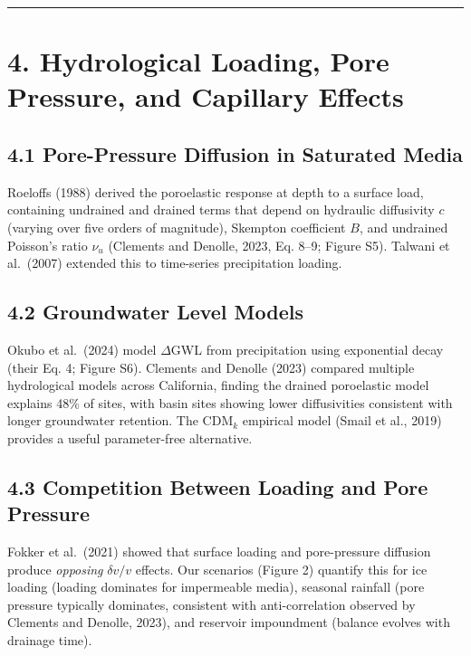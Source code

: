 \documentclass[12pt]{article}
\begin{document}
\begin{center}\rule{0.5\linewidth}{0.5pt}\end{center}

\section{4. Hydrological Loading, Pore Pressure, and Capillary
Effects}\label{hydrological-loading-pore-pressure-and-capillary-effects}

\subsection{4.1 Pore-Pressure Diffusion in Saturated
Media}\label{pore-pressure-diffusion-in-saturated-media}

Roeloffs (1988) derived the poroelastic response at depth to a surface
load, containing undrained and drained terms that depend on hydraulic
diffusivity \(c\) (varying over five orders of magnitude), Skempton
coefficient \(B\), and undrained Poisson's ratio \(\nu_u\) (Clements and
Denolle, 2023, Eq. 8--9; Figure S5). Talwani et al.~(2007) extended this
to time-series precipitation loading.

\subsection{4.2 Groundwater Level
Models}\label{groundwater-level-models}

Okubo et al.~(2024) model \(\Delta\)GWL from precipitation using
exponential decay (their Eq. 4; Figure S6). Clements and Denolle (2023)
compared multiple hydrological models across California, finding the
drained poroelastic model explains 48\% of sites, with basin sites
showing lower diffusivities consistent with longer groundwater
retention. The CDM\(_k\) empirical model (Smail et al., 2019) provides a
useful parameter-free alternative.

\subsection{4.3 Competition Between Loading and Pore
Pressure}\label{competition-between-loading-and-pore-pressure}

Fokker et al.~(2021) showed that surface loading and pore-pressure
diffusion produce \emph{opposing} \(\delta v/v\) effects. Our scenarios
(Figure 2) quantify this for ice loading (loading dominates for
impermeable media), seasonal rainfall (pore pressure typically
dominates, consistent with anti-correlation observed by Clements and
Denolle, 2023), and reservoir impoundment (balance evolves with drainage
time).
\end{document}
